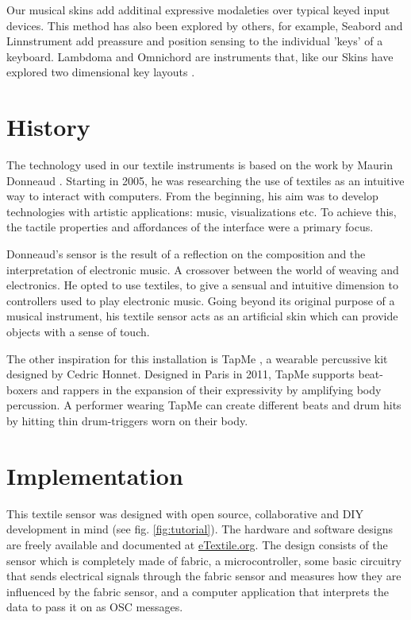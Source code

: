 \documentclass{sigchi-ext}
\begin{document}
Our musical skins add additinal expressive modaleties over typical keyed input devices. This method has also been explored by others, for example, Seabord and Linnstrument \cite{seaboard, linnstrument} add preassure and position sensing to the individual 'keys' of a keyboard. Lambdoma and Omnichord are instruments that, like our Skins have explored two dimensional key layouts \cite{lambdoma, omnichord}.


\section{History}
The technology used in our textile instruments is based on the work by Maurin Donneaud \cite{donneaud}. Starting in 2005, he was researching the use of textiles as an intuitive way to interact with computers. From the beginning, his aim was to develop technologies with artistic applications: music, visualizations etc. To achieve this, the tactile properties and affordances of the interface were a primary focus.

Donneaud's sensor is the result of a reflection on the composition and the interpretation of electronic music. A crossover between the world of weaving and electronics. He opted to use textiles, to give a sensual and intuitive dimension to controllers used to play electronic music. Going beyond its original purpose of a musical instrument, his textile sensor acts as an artificial skin which can provide objects with a sense of touch.

The other inspiration for this installation is TapMe \cite{tapme}, a wearable percussive kit designed by Cedric Honnet. Designed in Paris in 2011, TapMe supports beat-boxers and rappers in the expansion of their expressivity by amplifying body percussion. A performer wearing TapMe can create different beats and drum hits by hitting thin drum-triggers worn on their body.


\section{Implementation}

This textile sensor was designed with open source, collaborative and DIY development in mind (see fig. \ref{fig:tutorial}). The hardware and software designs are freely available and documented at \url{eTextile.org}. The design consists of the sensor which is completely made of fabric, a microcontroller, some basic circuitry that sends electrical signals through the fabric sensor and measures how they are influenced by the fabric sensor, and a computer application that interprets the data to pass it on as OSC messages.
\end{document}
